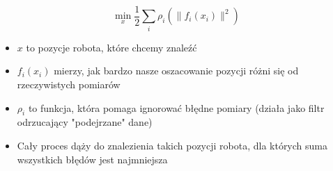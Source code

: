 \documentclass[a4paper,twoside,12pt]{book}
\begin{document}
\begin{itemize}
\begin{equation}
\min_x \frac{1}{2}\sum_{i} \rho_i(\|f_i(x_i)\|^2)
\end{equation}


\begin{itemize}
\item $x$ to pozycje robota, które chcemy znaleźć 
\item $f_i(x_i)$ mierzy, jak bardzo nasze oszacowanie pozycji różni się od rzeczywistych pomiarów
\item $\rho_i$ to funkcja, która pomaga ignorować błędne pomiary (działa jako filtr odrzucający "podejrzane" dane)
\item Cały proces dąży do znalezienia takich pozycji robota, dla których suma wszystkich błędów jest najmniejsza
\end{itemize}

\end{itemize}
\end{document}

